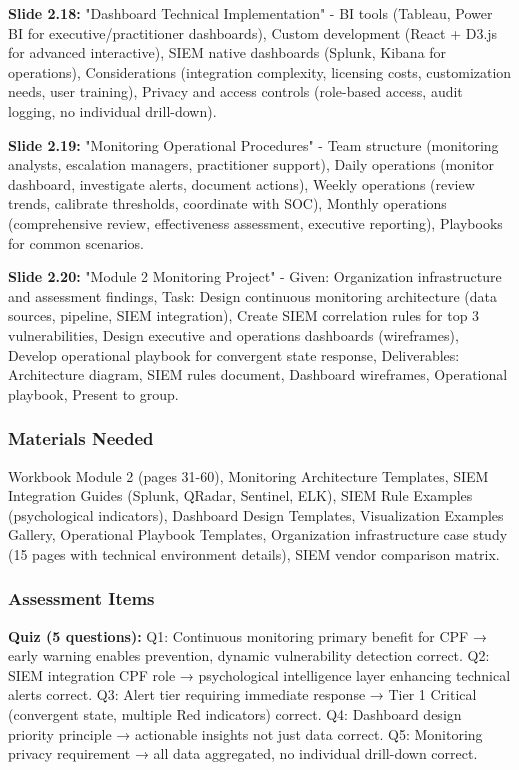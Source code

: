 \documentclass[11pt,a4paper]{article}
\begin{document}
\textbf{Slide 2.18:} "Dashboard Technical Implementation" - BI tools (Tableau, Power BI for executive/practitioner dashboards), Custom development (React + D3.js for advanced interactive), SIEM native dashboards (Splunk, Kibana for operations), Considerations (integration complexity, licensing costs, customization needs, user training), Privacy and access controls (role-based access, audit logging, no individual drill-down).

\textbf{Slide 2.19:} "Monitoring Operational Procedures" - Team structure (monitoring analysts, escalation managers, practitioner support), Daily operations (monitor dashboard, investigate alerts, document actions), Weekly operations (review trends, calibrate thresholds, coordinate with SOC), Monthly operations (comprehensive review, effectiveness assessment, executive reporting), Playbooks for common scenarios.

\textbf{Slide 2.20:} "Module 2 Monitoring Project" - Given: Organization infrastructure and assessment findings, Task: Design continuous monitoring architecture (data sources, pipeline, SIEM integration), Create SIEM correlation rules for top 3 vulnerabilities, Design executive and operations dashboards (wireframes), Develop operational playbook for convergent state response, Deliverables: Architecture diagram, SIEM rules document, Dashboard wireframes, Operational playbook, Present to group.

\subsubsection{Materials Needed}

Workbook Module 2 (pages 31-60), Monitoring Architecture Templates, SIEM Integration Guides (Splunk, QRadar, Sentinel, ELK), SIEM Rule Examples (psychological indicators), Dashboard Design Templates, Visualization Examples Gallery, Operational Playbook Templates, Organization infrastructure case study (15 pages with technical environment details), SIEM vendor comparison matrix.

\subsubsection{Assessment Items}

\textbf{Quiz (5 questions):} Q1: Continuous monitoring primary benefit for CPF → early warning enables prevention, dynamic vulnerability detection correct. Q2: SIEM integration CPF role → psychological intelligence layer enhancing technical alerts correct. Q3: Alert tier requiring immediate response → Tier 1 Critical (convergent state, multiple Red indicators) correct. Q4: Dashboard design priority principle → actionable insights not just data correct. Q5: Monitoring privacy requirement → all data aggregated, no individual drill-down correct.
\end{document}
